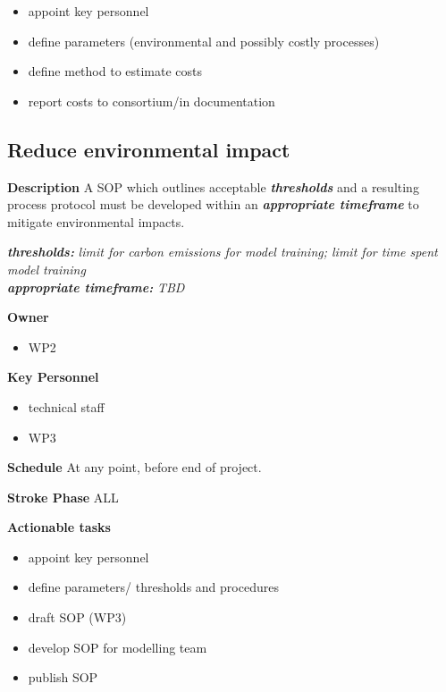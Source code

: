 \documentclass[
  letterpaper,
  DIV=11,
  numbers=noendperiod]{scrreport}
\providecommand{\tightlist}{%
  \setlength{\itemsep}{0pt}\setlength{\parskip}{0pt}}\usepackage{longtable,booktabs,array}
\begin{document}
\begin{itemize}
\tightlist
\item
  appoint key personnel
\item
  define parameters (environmental and possibly costly processes)
\item
  define method to estimate costs
\item
  report costs to consortium/in documentation
\end{itemize}

\hypertarget{reduce-environmental-impact}{%
\subsection{Reduce environmental
impact}\label{reduce-environmental-impact}}

\textbf{Description} A SOP which outlines acceptable
\textbf{\emph{thresholds}} and a resulting process protocol must be
developed within an \textbf{\emph{appropriate timeframe}} to mitigate
environmental impacts.

\textbf{\emph{thresholds:}} \emph{limit for carbon emissions for model
training; limit for time spent model training}\\
\textbf{\emph{appropriate timeframe:}} \emph{TBD}

\textbf{Owner}

\begin{itemize}
\tightlist
\item
  WP2
\end{itemize}

\textbf{Key Personnel}

\begin{itemize}
\tightlist
\item
  technical staff
\item
  WP3
\end{itemize}

\textbf{Schedule} At any point, before end of project.

\textbf{Stroke Phase} ALL

\textbf{Actionable tasks}

\begin{itemize}
\tightlist
\item
  appoint key personnel
\item
  define parameters/ thresholds and procedures
\item
  draft SOP (WP3)
\item
  develop SOP for modelling team
\item
  publish SOP
\end{itemize}
\end{document}
